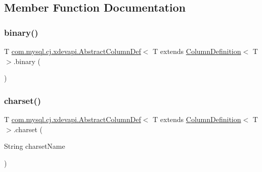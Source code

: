 \subsection{Member Function Documentation}
\mbox{\label{classcom_1_1mysql_1_1cj_1_1xdevapi_1_1_abstract_column_def_ab0a33d432060ea2c41dc221435eaaa59}} 
\subsubsection{\texorpdfstring{binary()}{binary()}}
{\footnotesize\ttfamily T \mbox{\hyperlink{classcom_1_1mysql_1_1cj_1_1xdevapi_1_1_abstract_column_def}{com.\+mysql.\+cj.\+xdevapi.\+Abstract\+Column\+Def}}$<$ T extends \mbox{\hyperlink{interfacecom_1_1mysql_1_1cj_1_1protocol_1_1_column_definition}{Column\+Definition}}$<$ T $>$.binary (\begin{DoxyParamCaption}{ }\end{DoxyParamCaption})}

\mbox{\label{classcom_1_1mysql_1_1cj_1_1xdevapi_1_1_abstract_column_def_ac2b2f3a49740b1fc7524858838bc1538}} 
\subsubsection{\texorpdfstring{charset()}{charset()}}
{\footnotesize\ttfamily T \mbox{\hyperlink{classcom_1_1mysql_1_1cj_1_1xdevapi_1_1_abstract_column_def}{com.\+mysql.\+cj.\+xdevapi.\+Abstract\+Column\+Def}}$<$ T extends \mbox{\hyperlink{interfacecom_1_1mysql_1_1cj_1_1protocol_1_1_column_definition}{Column\+Definition}}$<$ T $>$.charset (\begin{DoxyParamCaption}\item[{String}]{charset\+Name }\end{DoxyParamCaption})}

